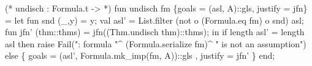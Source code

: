 \nwenddocs{}\plusendmoddef\nwstartdeflinemarkup{}\nwenddeflinemarkup
(* undisch : Formula.t ->  *)
fun undisch fm \{goals = (asl, A)::gls, justify = jfn\} =
  let
    fun snd (_,y) = y;
    val asl' = List.filter (not o (Formula.eq fm) o snd) asl;
    fun jfn' (thm::thms) = jfn((Thm.undisch thm)::thms);
  in
    if length asl' = length asl
    then raise Fail(": formula "^
                    (Formula.serialize fm)^
                    " is not an assumption")
    else \{ goals = (asl', Formula.mk_imp(fm, A))::gls
         , justify = jfn' \}
  end;

